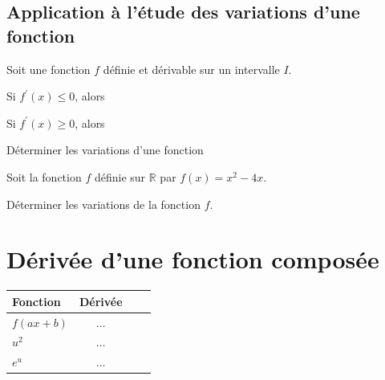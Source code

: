     \subsection{Application à l'étude des variations d'une fonction}
    
    \begin{bthm}
    	Soit une fonction $f$ définie et dérivable sur un intervalle $I$.
    	\begin{itemProp}
    		\item Si $f^{\prime}(x) \leqslant 0$, alors \pointilles[\textwidth-5cm]
	    	\item Si $f^{\prime}(x) \geqslant 0$, alors \pointilles[\textwidth-5cm]
    	\end{itemProp}
    \end{bthm}
    
    \begin{bmethodet}{Déterminer les variations d'une fonction}
    	
    	Soit la fonction $f$ définie sur $\mathbb{R}$ par $f(x)=x^2-4 x$.
    	
    	Déterminer les variations de la fonction $f$.
    	
    	
    	\pointilles[\textwidth-0.5cm]
    	
    	\pointilles[\textwidth-0.5cm]
    	
    	\pointilles[\textwidth-0.5cm]
    	
    	\pointilles[\textwidth-0.5cm]
    	
    	\pointilles[\textwidth-0.5cm]
    	
    	\pointilles[\textwidth-0.5cm]
    	
    	\pointilles[\textwidth-0.5cm]
    \end{bmethodet}
    
    \section{Dérivée d'une fonction composée}
    
    \begin{center}
    	\renewcommand{\arraystretch}{2}
    	\begin{tabular}{|Xc|Xc|}
    		\hline Fonction & Dérivée \\
    		\hline$f(a x+b)$ & $\ldots$ \\
    		\hline$u^2$ & $\ldots$ \\
    		\hline$e^u$ & $\ldots$ \\
    		\hline
    	\end{tabular}
    \end{center}
    
